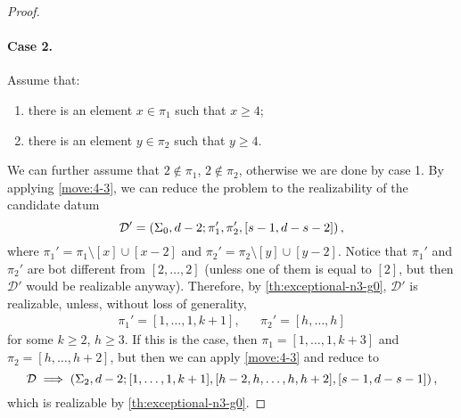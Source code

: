 \documentclass{article}
\begin{document}
\begin{proof}
\paragraph{Case 2.} Assume that:
\begin{enumerate}
\item there is an element $x\in\pi_1$ such that $x\ge 4$;
\item there is an element $y\in\pi_2$ such that $y\ge 4$.
\end{enumerate}
We can further assume that $2\not\in\pi_1$, $2\not\in\pi_2$, otherwise we are done by case 1. By applying \cref{move:4-3}, we can reduce the problem to the realizability of the candidate datum
\[
\mathcal{D}'=\left(\Sigma_0,d-2;\pi_1',\pi_2',[s-1,d-s-2]\right),
\]
where $\pi_1'=\pi_1\setminus[x]\cup[x-2]$ and $\pi_2'=\pi_2\setminus[y]\cup[y-2]$. Notice that $\pi_1'$ and $\pi_2'$ are bot different from $[2,\ldots,2]$ (unless one of them is equal to $[2]$, but then $\mathcal{D}'$ would be realizable anyway). Therefore, by \cref{th:exceptional-n3-g0}, $\mathcal{D}'$ is realizable, unless, without loss of generality,
\begin{align*}
\pi_1'=[1,\ldots,1,k+1],&&\pi_2'=[h,\ldots,h]
\end{align*}
for some $k\ge 2$, $h\ge 3$. If this is the case, then $\pi_1=[1,\ldots,1,k+3]$ and $\pi_2=[h,\ldots,h+2]$, but then we can apply \cref{move:4-3} and reduce to
\[
\mathcal{D}\implies\left(\Sigma_2,d-2;[1,\ldots,1,k+1],[h-2,h,\ldots,h,h+2],[s-1,d-s-1]\right),
\]
which is realizable by \cref{th:exceptional-n3-g0}.


\end{proof}
\end{document}
